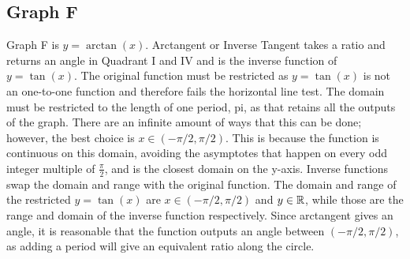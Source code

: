 \subsection{Graph F}

Graph F is ${y=\arctan(x)}$.
Arctangent or Inverse Tangent takes a ratio and returns an angle in Quadrant I and IV and is the inverse function of ${y=\tan(x)}$.
The original function must be restricted as ${y=\tan(x)}$ is not an one-to-one function and therefore fails the horizontal line test.
The domain must be restricted to the length of one period, pi, as that retains all the outputs of the graph.
There are an infinite amount of ways that this can be done; however, the best choice is ${x \in {({-\pi/2}, {\pi/2})}}$.
This is because the function is continuous on this domain, avoiding the asymptotes that happen on every odd integer multiple of ${\frac{\pi}{2}}$, and is the closest domain on the y-axis.
Inverse functions swap the domain and range with the original function.
The domain and range of the restricted ${y=\tan(x)}$ are ${x \in {({-\pi/2}, {\pi/2})}}$ and ${y \in \mathbb{R}}$, while those are the range and domain of the inverse function respectively.
Since arctangent gives an angle, it is reasonable that the function outputs an angle between ${({-\pi/2}, {\pi/2})}$, as adding a period will give an equivalent ratio along the circle.
